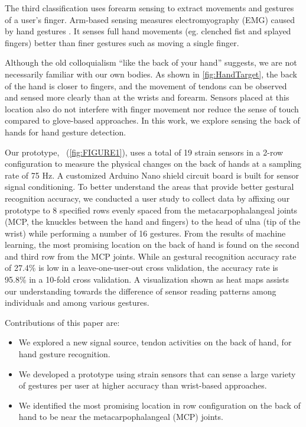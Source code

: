 \documentclass{sigchi}
\begin{document}
The third classification uses forearm sensing to extract movements and gestures of a user's finger. Arm-based sensing measures electromyography (EMG) caused by hand gestures \cite{Myo, Saponas:2009:EAI:1622176.1622208}. It senses full hand movements (eg. clenched fist and splayed fingers) better than finer gestures such as moving a single finger.

Although the old colloquialism ``like the back of your hand'' suggests, we are not necessarily familiar with our own bodies. As shown in \autoref{fig:HandTarget}, the back of the hand is closer to fingers, and the movement of tendons can be observed and sensed more clearly than at the wrists and forearm. Sensors placed at this location also do not interfere with finger movement nor reduce the sense of touch compared to glove-based approaches. In this work, we explore sensing the back of hands for hand gesture detection.

Our prototype, \getTitleName\ (\autoref{fig:FIGURE1}), uses a total of 19 strain sensors in a 2-row configuration to measure the physical changes on the back of hands at a sampling rate of 75 Hz. A customized Arduino Nano shield circuit board is built for sensor signal conditioning. To better understand the areas that provide better gestural recognition accuracy, we conducted a user study to collect data by affixing our prototype to 8 specified rows evenly spaced from the metacarpophalangeal joints (MCP, the knuckles between the hand and fingers) to the head of ulna (tip of the wrist) while performing a number of 16 gestures. From the results of machine learning, the most promising location on the back of hand is found on the second and third row from the MCP joints. While an gestural recognition accuracy rate of 27.4\% is low in a leave-one-user-out cross validation, the accuracy rate is 95.8\% in a 10-fold cross validation. A visualization shown as heat maps assists our understanding towards the difference of sensor reading patterns among individuals and among various gestures.

Contributions of this paper are:
\begin{itemize}
\item We explored a new signal source, tendon activities on the back of hand, for hand gesture recognition.
\item We developed a prototype using strain sensors that can sense a large variety of gestures per user at higher accuracy than wrist-based approaches. 
\item We identified the most promising location in row configuration on the back of hand to be near the metacarpophalangeal (MCP) joints.
\end{itemize}
\end{document}
